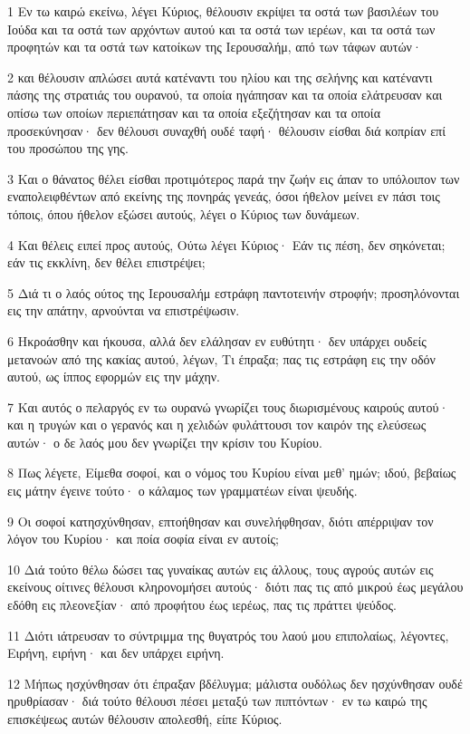 \par 1 Εν τω καιρώ εκείνω, λέγει Κύριος, θέλουσιν εκρίψει τα οστά των βασιλέων του Ιούδα και τα οστά των αρχόντων αυτού και τα οστά των ιερέων, και τα οστά των προφητών και τα οστά των κατοίκων της Ιερουσαλήμ, από των τάφων αυτών·
\par 2 και θέλουσιν απλώσει αυτά κατέναντι του ηλίου και της σελήνης και κατέναντι πάσης της στρατιάς του ουρανού, τα οποία ηγάπησαν και τα οποία ελάτρευσαν και οπίσω των οποίων περιεπάτησαν και τα οποία εξεζήτησαν και τα οποία προσεκύνησαν· δεν θέλουσι συναχθή ουδέ ταφή· θέλουσιν είσθαι διά κοπρίαν επί του προσώπου της γης.
\par 3 Και ο θάνατος θέλει είσθαι προτιμότερος παρά την ζωήν εις άπαν το υπόλοιπον των εναπολειφθέντων από εκείνης της πονηράς γενεάς, όσοι ήθελον μείνει εν πάσι τοις τόποις, όπου ήθελον εξώσει αυτούς, λέγει ο Κύριος των δυνάμεων.
\par 4 Και θέλεις ειπεί προς αυτούς, Ούτω λέγει Κύριος· Εάν τις πέση, δεν σηκόνεται; εάν τις εκκλίνη, δεν θέλει επιστρέψει;
\par 5 Διά τι ο λαός ούτος της Ιερουσαλήμ εστράφη παντοτεινήν στροφήν; προσηλόνονται εις την απάτην, αρνούνται να επιστρέψωσιν.
\par 6 Ηκροάσθην και ήκουσα, αλλά δεν ελάλησαν εν ευθύτητι· δεν υπάρχει ουδείς μετανοών από της κακίας αυτού, λέγων, Τι έπραξα; πας τις εστράφη εις την οδόν αυτού, ως ίππος εφορμών εις την μάχην.
\par 7 Και αυτός ο πελαργός εν τω ουρανώ γνωρίζει τους διωρισμένους καιρούς αυτού· και η τρυγών και ο γερανός και η χελιδών φυλάττουσι τον καιρόν της ελεύσεως αυτών· ο δε λαός μου δεν γνωρίζει την κρίσιν του Κυρίου.
\par 8 Πως λέγετε, Είμεθα σοφοί, και ο νόμος του Κυρίου είναι μεθ' ημών; ιδού, βεβαίως εις μάτην έγεινε τούτο· ο κάλαμος των γραμματέων είναι ψευδής.
\par 9 Οι σοφοί κατησχύνθησαν, επτοήθησαν και συνελήφθησαν, διότι απέρριψαν τον λόγον του Κυρίου· και ποία σοφία είναι εν αυτοίς;
\par 10 Διά τούτο θέλω δώσει τας γυναίκας αυτών εις άλλους, τους αγρούς αυτών εις εκείνους οίτινες θέλουσι κληρονομήσει αυτούς· διότι πας τις από μικρού έως μεγάλου εδόθη εις πλεονεξίαν· από προφήτου έως ιερέως, πας τις πράττει ψεύδος.
\par 11 Διότι ιάτρευσαν το σύντριμμα της θυγατρός του λαού μου επιπολαίως, λέγοντες, Ειρήνη, ειρήνη· και δεν υπάρχει ειρήνη.
\par 12 Μήπως ησχύνθησαν ότι έπραξαν βδέλυγμα; μάλιστα ουδόλως δεν ησχύνθησαν ουδέ ηρυθρίασαν· διά τούτο θέλουσι πέσει μεταξύ των πιπτόντων· εν τω καιρώ της επισκέψεως αυτών θέλουσιν απολεσθή, είπε Κύριος.
